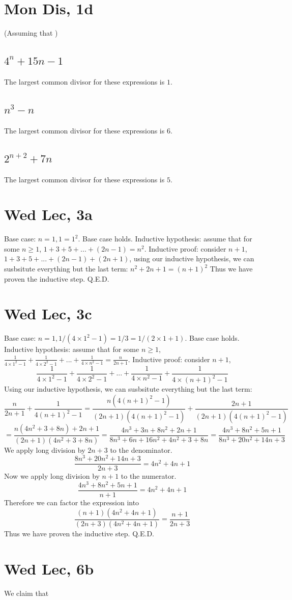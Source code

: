 \documentclass[12pt]{article}
\begin{document}
\section{Mon Dis, 1d}
(Assuming that )
\subsection{$4^n + 15n -1$}
The largest common divisor for these expressions is $1$.

\subsection{$n^3 - n$}
The largest common divisor for these expressions is $6$.

\subsection{$2^{n+2} + 7n$}
The largest common divisor for these expressions is $5$.
\newpage


\section{Wed Lec, 3a}
Base case: $n = 1, 1 = 1^2$. Base case holds.
\newline
Inductive hypothesis: assume that for some $n \geq 1$, $1+ 3 + 5 + ... + (2n-1) = n^2$.
\newline
Inductive proof: consider $n+1$, $1+ 3 + 5 + ... + (2n-1) + (2n+1)$, using our inductive hypothesis, we can susbsitute everything but the last term: $n^2 + 2n + 1 = (n+1)^2$
\newline
Thus we have proven the inductive step. Q.E.D.

\section{Wed Lec, 3c}
Base case: $n = 1, 1/(4 \times 1^2 - 1) = 1/3 = 1/(2 \times 1 + 1)$. Base case holds.
\newline
Inductive hypothesis: assume that for some $n \geq 1$, $\frac{1}{4 \times 1^2 - 1} + \frac{1}{4 \times 2^2 - 1} + ... + \frac{1}{4 \times n^2 - 1} = \frac{n}{2n+1}$.
\newline
Inductive proof: consider $n+1$, $$\frac{1}{4 \times 1^2 - 1} + \frac{1}{4 \times 2^2 - 1} + ... + \frac{1}{4 \times n^2 - 1} + \frac{1}{4 \times (n+1)^2 - 1}$$
Using our inductive hypothesis, we can susbsitute everything but the last term: $$\frac{n}{2n+1} + \frac{1}{4(n+1)^2 - 1} = \frac{n (4(n+1)^2-1)}{(2n+1)(4(n+1)^2-1)} + \frac{2n+1}{(2n+1)(4(n+1)^2 - 1)}$$
$$=\frac{n(4n^2+3+8n) + 2n +1}{(2n+1)(4n^2+3+8n)} = \frac{4n^3+3n+8n^2+2n+1}{8n^3+6n+16n^2+4n^2+3+8n}=\frac{4n^3+8n^2+5n+1}{8n^3+20n^2+14n+3}$$
We apply long division by $2n+3$ to the denominator.
$$\frac{8n^3+20n^2+14n+3}{2n+3} = 4n^2 + 4n + 1$$
Now we apply long division by $n+1$ to the numerator.
$$\frac{4n^3+8n^2+5n+1}{n+1} =  4n^2 + 4n + 1$$
Therefore we can factor the expression into
$$\frac{(n+1)(4n^2 + 4n + 1)}{(2n+3)(4n^2 + 4n + 1)} = \frac{n+1}{2n+3}$$
\newline
Thus we have proven the inductive step. Q.E.D.

\section{Wed Lec, 6b}
We claim that
\end{document}
